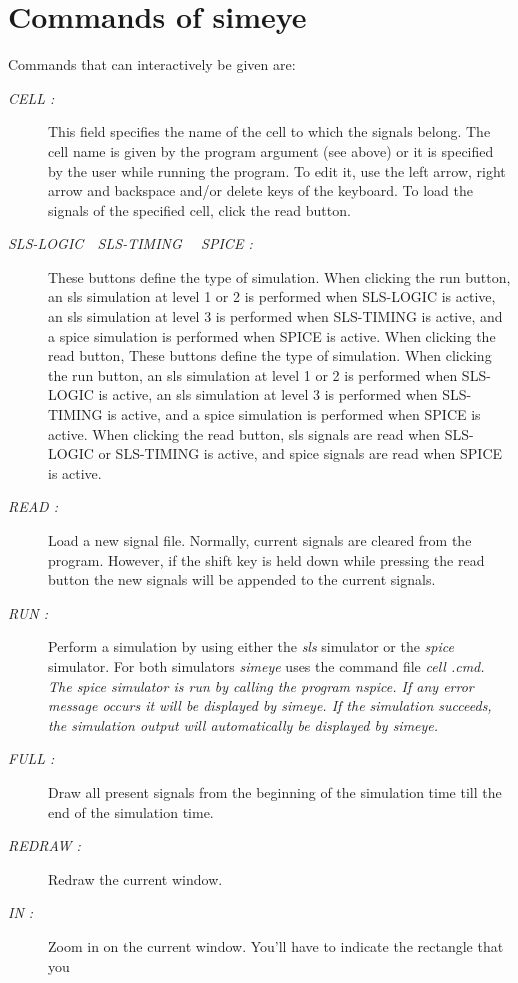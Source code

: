 \section{Commands of simeye}
Commands that can interactively be given are:
\begin{description}
\item[{\it CELL : }]
This field
specifies the name of the cell to which the signals belong.
The cell name is given by the program argument (see above)
or it is specified by the
user while running the program.
To edit it, use the left arrow, right arrow
and backspace and/or delete keys of the keyboard.
To load the signals of the specified cell, click the read button.
\item[{\it SLS-LOGIC\ \ SLS-TIMING \ \ SPICE : }]
These buttons define the type of simulation.
When clicking the run button,
an sls simulation at level 1 or 2 is performed when SLS-LOGIC
is active,
an sls simulation at level 3 is performed when SLS-TIMING
is active,
and a spice simulation is performed when SPICE
is active.
When clicking the read button,
These buttons define the type of simulation.
When clicking the run button,
an sls simulation at level 1 or 2 is performed when SLS-LOGIC
is active,
an sls simulation at level 3 is performed when SLS-TIMING
is active,
and a spice simulation is performed when SPICE
is active.
When clicking the read button,
sls signals are read when SLS-LOGIC or SLS-TIMING is active,
and spice signals are read when SPICE is active.
\item[{\it READ : }]
Load a new signal file.
Normally, current signals are cleared from the program.
However, if the shift key is held down while pressing the
read button the new signals will be appended to the current signals.
\item[{\it RUN : }]
Perform a simulation by using either the
{\it sls}
simulator or the
{\it spice}
simulator.
For both simulators
{\it simeye}
uses the command file %
\it cell\rm%
.cmd.
The spice simulator is run by calling the program 
{\it nspice.} 
If any error message occurs it will be displayed by 
{\it simeye.}
If the simulation succeeds, the simulation output 
will automatically be displayed by
{\it simeye.}
\item[{\it FULL : }]
Draw all present signals from the beginning of the simulation
time till the end of the simulation time.
\item[{\it REDRAW : }]
Redraw the current window.
\item[{\it IN : }]
Zoom in on the current window. You'll have to indicate the rectangle that you

\end{description}

